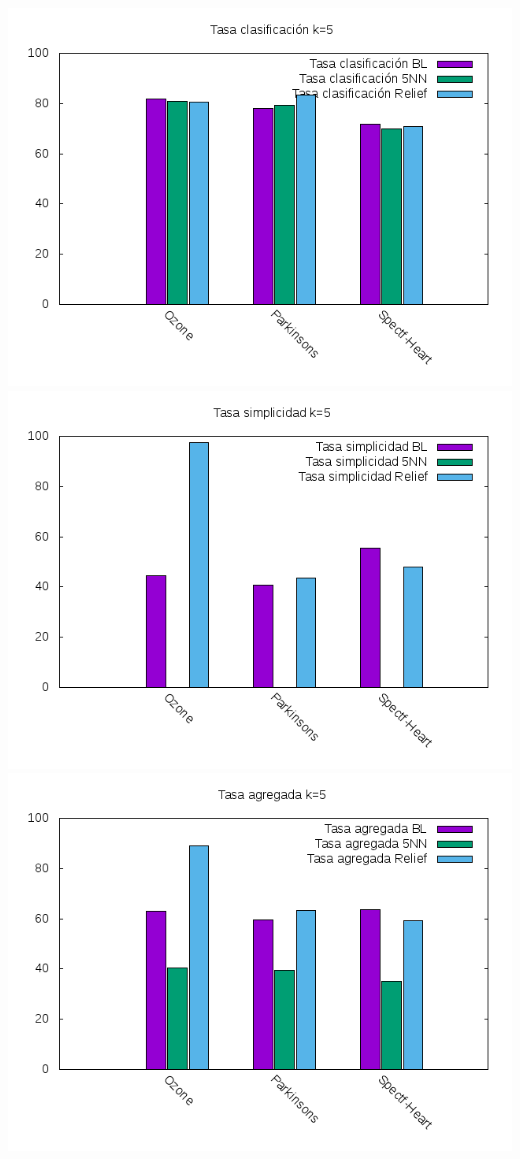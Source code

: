 \documentclass[12pt,a4paper]{article}
\begin{document}
	\includegraphics*[scale=1]{./Imagenes/K5/tasa_clas.png}
	\newline
	\includegraphics*[scale=1]{./Imagenes/K5/tasa_simpl.png}
	\newline
	\includegraphics*[scale=1]{./Imagenes/K5/tasa_agr.png}
\end{document}
